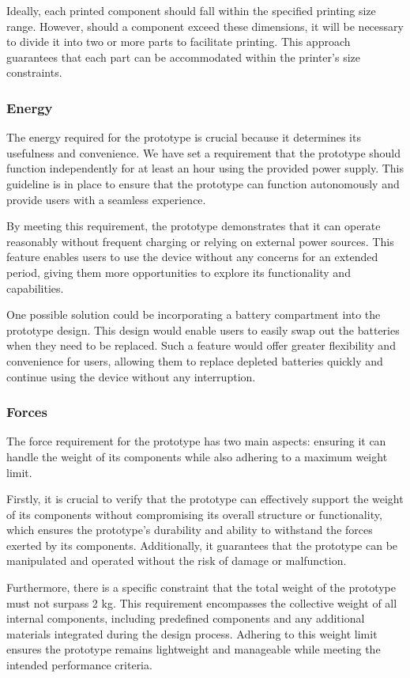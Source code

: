 Ideally, each printed component should fall within the specified printing size range. However, should a component exceed these dimensions, it will be necessary to divide it into two or more parts to facilitate printing. This approach guarantees that each part can be accommodated within the printer's size constraints.

\subsubsection{Energy}
The energy required for the prototype is crucial because it determines its usefulness and convenience. We have set a requirement that the prototype should function independently for at least an hour using the provided power supply. This guideline is in place to ensure that the prototype can function autonomously and provide users with a seamless experience.

By meeting this requirement, the prototype demonstrates that it can operate reasonably without frequent charging or relying on external power sources. This feature enables users to use the device without any concerns for an extended period, giving them more opportunities to explore its functionality and capabilities.

One possible solution could be incorporating a battery compartment into the prototype design. This design would enable users to easily swap out the batteries when they need to be replaced. Such a feature would offer greater flexibility and convenience for users, allowing them to replace depleted batteries quickly and continue using the device without any interruption.

\subsubsection{Forces}
The force requirement for the prototype has two main aspects: ensuring it can handle the weight of its components while also adhering to a maximum weight limit.

Firstly, it is crucial to verify that the prototype can effectively support the weight of its components without compromising its overall structure or functionality, which ensures the prototype's durability and ability to withstand the forces exerted by its components. Additionally, it guarantees that the prototype can be manipulated and operated without the risk of damage or malfunction.

Furthermore, there is a specific constraint that the total weight of the prototype must not surpass 2 kg. This requirement encompasses the collective weight of all internal components, including predefined components and any additional materials integrated during the design process. Adhering to this weight limit ensures the prototype remains lightweight and manageable while meeting the intended performance criteria.

